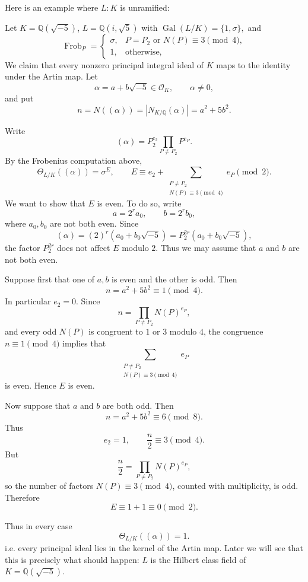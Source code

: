 Here is an example where $L:K$ is unramified:
\begin{example}
\label{eg-ArtinPrincipalMinusFive}
Let
$
K=\mathbb Q(\sqrt{-5})$, $L=\mathbb Q(i,\sqrt5)
$ with
$
\operatorname{Gal}(L/K)=\{1,\sigma\},
$ and
$$
\operatorname{Frob}_P=
\begin{cases}
\sigma,&P=P_2\text{ or }N(P)\equiv3\pmod4,\\
1,&\text{otherwise},
\end{cases}
$$
We claim that every nonzero principal integral ideal of $K$ maps to the
identity under the Artin map. Let
$$
\alpha=a+b\sqrt{-5}\in\mathcal O_K,
\qquad
\alpha\neq0,
$$
and put
$$
n=N((\alpha))
=|N_{K/\mathbb Q}(\alpha)|
=a^2+5b^2.
$$

Write
$$
(\alpha)=P_2^{e_2}\prod_{P\neq P_2}P^{e_P}.
$$
By the Frobenius computation above,
$$
\Theta_{L/K}((\alpha))=\sigma^E,
\qquad
E\equiv
e_2+
\sum_{\substack{P\neq P_2\\N(P)\equiv3\pmod4}}
e_P
\pmod2.
$$
We want to show that $E$ is even. To do so, write
$$
a=2^r a_0,\qquad b=2^r b_0,
$$
where $a_0,b_0$ are not both even. Since
$$
(\alpha)=(2)^r(a_0+b_0\sqrt{-5})
=P_2^{2r}(a_0+b_0\sqrt{-5}),
$$
the factor $P_2^{2r}$ does not affect $E$ modulo $2$. Thus we may assume
that $a$ and $b$ are not both even.

Suppose first that one of $a,b$ is even and the other is odd. Then
$$
n=a^2+5b^2\equiv1\pmod4.
$$
In particular $e_2=0$. Since
$$
n=\prod_{P\neq P_2}N(P)^{e_P},
$$
and every odd $N(P)$ is congruent to $1$ or $3$ modulo $4$, the
congruence $n\equiv1\pmod4$ implies that
$$
\sum_{\substack{P\neq P_2\\N(P)\equiv3\pmod4}}e_P
$$
is even. Hence $E$ is even.

Now suppose that $a$ and $b$ are both odd. Then
$$
n=a^2+5b^2\equiv6\pmod8.
$$
Thus
$$
e_2 =1, \qquad 
\frac n2\equiv3\pmod4.
$$
But
$$
\frac n2=\prod_{P\neq P_2}N(P)^{e_P},
$$
so the number of factors $N(P)\equiv3\pmod4$, counted with
multiplicity, is odd. Therefore
$$
E\equiv1+1\equiv0\pmod2.
$$

Thus in every case
$$
\boxed{\Theta_{L/K}((\alpha))=1.}
$$
i.e. every principal ideal lies in the kernel of the Artin map. Later we will see that this is precisely what should happen: $L$ is the
Hilbert class field of $K =\mathbb Q(\sqrt{-5})$.

\end{example}




